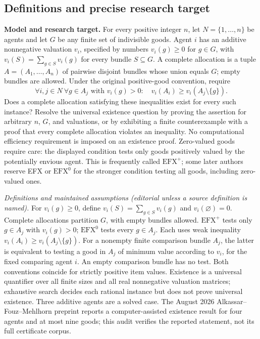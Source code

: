 \documentclass[11pt,a4paper]{article}
\begin{document}
\subsection*{Definitions and precise research target}
\textbf{Model and research target.} For every positive integer \(n\), let \(N=\{1,\ldots,n\}\) be agents and let \(G\) be any finite set of indivisible goods. Agent \(i\) has an additive nonnegative valuation \(v_i\), specified by numbers \(v_i(g)\geq0\) for \(g\in G\), with \(v_i(S)=\sum_{g\in S}v_i(g)\) for every bundle \(S\subseteq G\). A complete allocation is a tuple \(A=(A_1,\ldots,A_n)\) of pairwise disjoint bundles whose union equals \(G\); empty bundles are allowed. Under the original positive-good convention, require
\[
 \forall i,j\in N\ \forall g\in A_j\text{ with }v_i(g)>0:
 \quad v_i(A_i)\geq v_i(A_j\setminus\{g\}).
\]
Does a complete allocation satisfying these inequalities exist for every such instance? Resolve the universal existence question by proving the assertion for arbitrary \(n\), \(G\), and valuations, or by exhibiting a finite counterexample with a proof that every complete allocation violates an inequality. No computational efficiency requirement is imposed on an existence proof. Zero-valued goods require care: the displayed condition tests only goods positively valued by the potentially envious agent. This is frequently called \(\mathrm{EFX}^{+}\); some later authors reserve EFX or \(\mathrm{EFX}^{0}\) for the stronger condition testing all goods, including zero-valued ones.

\emph{Definitions and maintained assumptions (editorial unless a source definition is named).} For \(v_i(g)\ge0\), define \(v_i(S)=\sum_{g\in S}v_i(g)\) and \(v_i(\varnothing)=0\). Complete allocations partition \(G\), with empty bundles allowed. \(\mathrm{EFX}^{+}\) tests only \(g\in A_j\) with \(v_i(g)>0\); \(\mathrm{EFX}^{0}\) tests every \(g\in A_j\). Each uses weak inequality \(v_i(A_i)\ge v_i(A_j\setminus\{g\})\). For a nonempty finite comparison bundle \(A_j\), the latter is equivalent to testing a good in \(A_j\) of minimum value according to \(v_i\), for the fixed comparing agent \(i\). An empty comparison bundle has no test. Both conventions coincide for strictly positive item values. Existence is a universal quantifier over all finite sizes and all real nonnegative valuation matrices; exhaustive search decides each rational instance but does not prove universal existence. Three additive agents are a solved case. The August 2026 Alkassar--Fouz--Mehlhorn preprint reports a computer-assisted existence result for four agents and at most nine goods; this audit verifies the reported statement, not its full certificate corpus.
\end{document}
